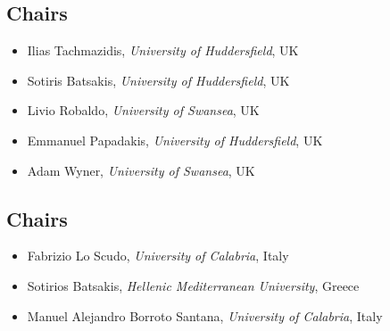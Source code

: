 \documentclass[
]{ceurart}
\begin{document}

\subsection*{Chairs}
\begin{itemize}
\item Ilias Tachmazidis, \emph{University of Huddersfield}, UK

\item Sotiris Batsakis, \emph{University of Huddersfield}, UK

\item Livio Robaldo, \emph{University of Swansea}, UK

\item Emmanuel Papadakis, \emph{University of Huddersfield}, UK

\item Adam Wyner, \emph{University of Swansea}, UK
\end{itemize}


\subsection*{Chairs}
\begin{itemize}
\item Fabrizio Lo Scudo, \emph{University of Calabria}, Italy

\item Sotirios Batsakis, \emph{Hellenic Mediterranean University}, Greece

\item Manuel Alejandro Borroto Santana, \emph{University of Calabria}, Italy
\end{itemize}
\end{document}
